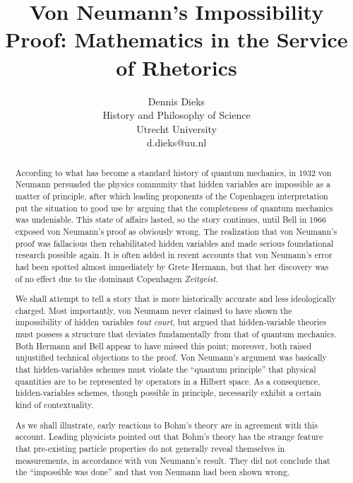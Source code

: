 \documentclass[12pt]{article}
\begin{document}
\date{}
\title{Von Neumann's Impossibility Proof: Mathematics in the Service of Rhetorics}
\author{Dennis Dieks \\History and Philosophy of Science\\
Utrecht University\\ d.dieks@uu.nl}
\maketitle
\begin{abstract}
According to what has become a standard history of quantum mechanics, in 1932 von Neumann persuaded the physics community that hidden variables are impossible as a matter of principle, after which leading proponents of the Copenhagen interpretation put the situation to good use by arguing that the completeness of quantum mechanics was undeniable. This state of affairs lasted, so the story continues, until Bell in 1966 exposed von Neumann's proof as obviously wrong. The realization that von Neumann's proof was fallacious then rehabilitated hidden variables and made serious foundational research possible again. It is often added in recent accounts that von Neumann's error had been spotted almost immediately by Grete Hermann, but that her discovery was of no effect due to the dominant Copenhagen \emph{Zeitgeist}.

We shall attempt to tell a story that is more historically accurate and less ideologically charged. Most importantly, von Neumann never claimed to have shown the impossibility of hidden variables \emph{tout court}, but argued that hidden-variable theories must possess a structure that deviates fundamentally from that of quantum mechanics. Both Hermann and Bell appear to have missed this point; moreover, both raised unjustified technical objections to the proof. Von Neumann's argument was basically that hidden-variables schemes must violate the ``quantum principle'' that physical quantities are to be represented by operators in a Hilbert space. As a consequence, hidden-variables schemes, though possible in principle, necessarily exhibit a certain kind of contextuality.

As we shall illustrate, early reactions to Bohm's theory are in agreement with this account. Leading physicists pointed out that Bohm's theory has the strange feature that pre-existing particle properties do not generally reveal themselves in measurements, in accordance with von Neumann's result.  They did not conclude that the ``impossible was done'' and that von Neumann had been shown wrong.

 \end{abstract}
\end{document}
